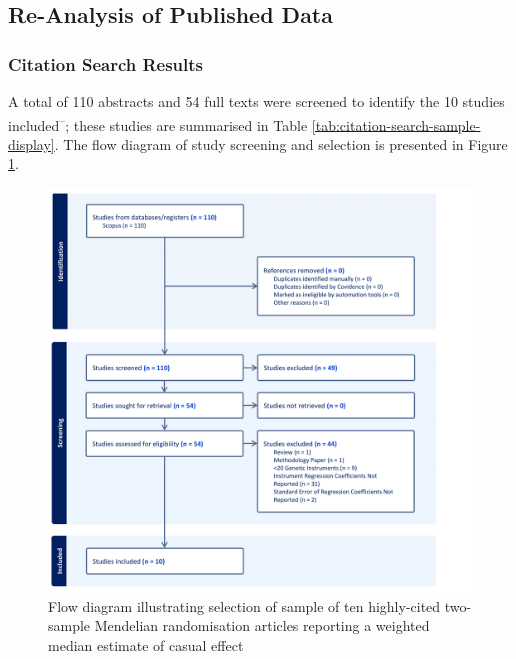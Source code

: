 \documentclass[
]{article}
\begin{document}
\newpage

\subsection{Re-Analysis of Published Data}\label{re-analysis-of-published-data-1}

\subsubsection{Citation Search Results}\label{citation-search-results}

A total of 110 abstracts and 54 full texts were screened to identify the 10 studies included\textsuperscript{--}; these studies are summarised in Table \ref{tab:citation-search-sample-display}. The flow diagram of study screening and selection is presented in Figure \ref{fig:screening-flow}.

\begin{figure}
\includegraphics[width=1\linewidth]{Data/Citations_Search/WME_citation_search_flow_diagram_crop} \caption{Flow diagram illustrating selection of sample of ten highly-cited two-sample Mendelian randomisation articles reporting a weighted median estimate of casual effect}\label{fig:screening-flow}
\end{figure}
\end{document}
